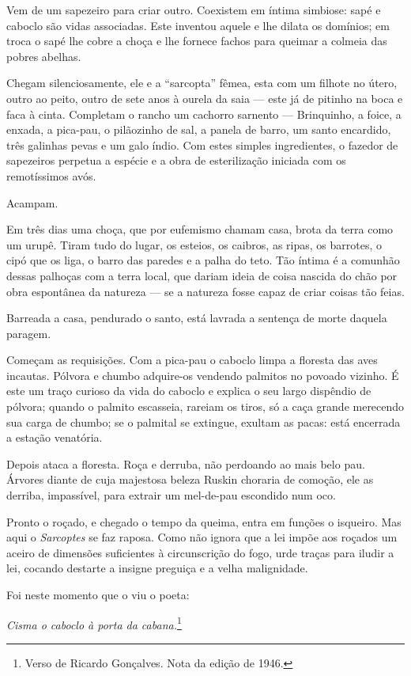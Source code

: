 Vem de um sapezeiro para criar outro. Coexistem em íntima simbiose: sapé
e caboclo são vidas associadas. Este inventou aquele e lhe dilata os
domínios; em troca o sapé lhe cobre a choça e lhe fornece fachos para
queimar a colmeia das pobres abelhas.

Chegam silenciosamente, ele e a ``sarcopta'' fêmea, esta com um filhote
no útero, outro ao peito, outro de sete anos à ourela da saia --- este
já de pitinho na boca e faca à cinta. Completam o rancho um cachorro
sarnento --- Brinquinho, a foice, a enxada, a pica-pau, o pilãozinho de
sal, a panela de barro, um santo encardido, três galinhas pevas e um
galo índio. Com estes simples ingredientes, o fazedor de sapezeiros
perpetua a espécie e a obra de esterilização iniciada com os
remotíssimos avós.

Acampam.

Em três dias uma choça, que por eufemismo chamam casa, brota da terra
como um urupê. Tiram tudo do lugar, os esteios, os caibros, as ripas, os
barrotes, o cipó que os liga, o barro das paredes e a palha do teto. Tão
íntima é a comunhão dessas palhoças com a terra local, que dariam ideia
de coisa nascida do chão por obra espontânea da natureza --- se a
natureza fosse capaz de criar coisas tão feias.

Barreada a casa, pendurado o santo, está lavrada a sentença de morte
daquela paragem.

Começam as requisições. Com a pica-pau o caboclo limpa a floresta das
aves incautas. Pólvora e chumbo adquire-os vendendo palmitos no povoado
vizinho. É este um traço curioso da vida do caboclo e explica o seu
largo dispêndio de pólvora; quando o palmito escasseia, rareiam os
tiros, só a caça grande merecendo sua carga de chumbo; se o palmital se
extingue, exultam as pacas: está encerrada a estação venatória.

Depois ataca a floresta. Roça e derruba, não perdoando ao mais belo pau.
Árvores diante de cuja majestosa beleza Ruskin choraria de comoção, ele
as derriba, impassível, para extrair um mel-de-pau escondido num oco.

Pronto o roçado, e chegado o tempo da queima, entra em funções o
isqueiro. Mas aqui o \emph{Sarcoptes} se faz raposa. Como não ignora que
a lei impõe aos roçados um aceiro de dimensões suficientes à
circunscrição do fogo, urde traças para iludir a lei, cocando destarte a
insigne preguiça e a velha malignidade.

Foi neste momento que o viu o poeta:

\emph{Cisma o caboclo à porta da cabana.}\footnote{Verso de Ricardo
  Gonçalves. Nota da edição de 1946.}


